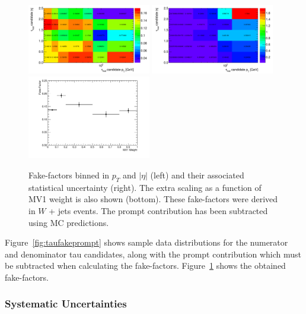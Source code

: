 \begin{figure}
\centering \includegraphics[width=0.48\textwidth]{figures/ch7-modelindependent/TauFakes_FFPt}
\centering \includegraphics[width=0.48\textwidth]{figures/ch7-modelindependent/TauFakes_FFEta}
\centering \includegraphics[width=0.48\textwidth]{figures/ch7-modelindependent/TauFakes_FFMV1}
\caption{\label{fig:taufakefactors} Fake-factors binned in $p_{T}$ and $|\eta|$ (left) and
  their associated statistical uncertainty (right). The extra scaling as a function of MV1
  weight is also shown (bottom).  These fake-factors were derived in $W$ + jets
  events. The prompt contribution has been subtracted using MC predictions.}
\end{figure}

Figure~\ref{fig:taufakeprompt} shows sample data distributions for the numerator and
denominator tau candidates, along with the prompt contribution which must be subtracted
when calculating the fake-factors. Figure~\ref{fig:taufakefactors} shows the obtained
fake-factors.

\subsubsection{Systematic Uncertainties}\label{sec:model-independent-ff-tau-systematics}

